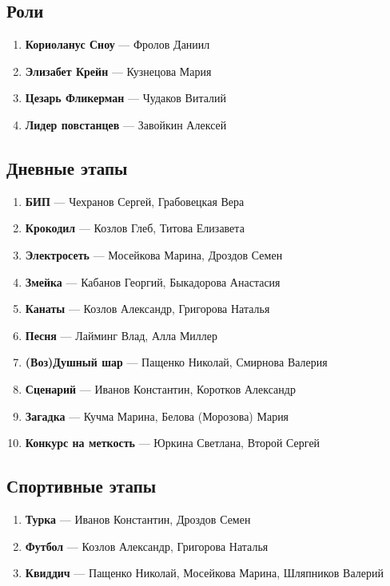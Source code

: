 
\subsection*{Роли}
\begin{enumerate}
\item \textbf{Кориоланус Сноу} --- Фролов Даниил
\item \textbf{Элизабет Крейн} --- Кузнецова Мария
\item \textbf{Цезарь Фликерман} --- Чудаков Виталий
\item \textbf{Лидер повстанцев} --- Завойкин Алексей
\end{enumerate}

\subsection*{Дневные этапы}
\begin{enumerate}
\item \textbf{БИП} --- Чехранов Сергей, Грабовецкая Вера
\item \textbf{Крокодил} --- Козлов Глеб, Титова Елизавета 
\item \textbf{Электросеть} --- Мосейкова Марина, Дроздов Семен 
\item \textbf{Змейка} --- Кабанов Георгий, Быкадорова Анастасия
\item \textbf{Канаты} --- Козлов Александр, Григорова Наталья 
\item \textbf{Песня} --- Лайминг Влад, Алла Миллер 
\item \textbf{(Воз)Душный шар} --- Пащенко Николай, Смирнова Валерия 
\item \textbf{Сценарий} --- Иванов Константин, Коротков Александр 
\item \textbf{Загадка} --- Кучма Марина, Белова (Морозова) Мария
\item \textbf{Конкурс на меткость} --- Юркина Светлана, Второй Сергей 
\end{enumerate}

\subsection*{Спортивные этапы}
\begin{enumerate}
\item \textbf{Турка} --- Иванов Константин, Дроздов Семен 
\item \textbf{Футбол} --- Козлов Александр, Григорова Наталья
\item \textbf{Квиддич} --- Пащенко Николай, Мосейкова Марина, Шляпников Валерий 
\end{enumerate}

